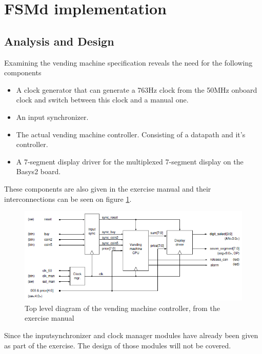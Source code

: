 \section{FSMd implementation}
\subsection{Analysis and Design}
Examining the vending machine specification reveals the need for the following components

\begin{itemize}
    \item A clock generator that can generate a 763Hz clock from the 50MHz onboard clock and switch between this clock and a manual one.
    \item An input synchronizer.
    \item The actual vending machine controller. Consisting of a datapath and it's controller.
    \item A 7-segment display driver for the multiplexed 7-segment display on the Basys2 board.
\end{itemize}

These components are also given in the exercise manual and their interconnections can be seen on figure \ref{vending_top}.

\begin{figure}[h]
    \center
    \includegraphics[width=1\textwidth]{pictures/vending_top.png}
    \caption{Top level diagram of the vending machine controller, from the exercise manual}
    \label{vending_top}
\end{figure}

Since the inputsynchronizer and clock manager modules have already been given as part of the exercise. The design of those modules will not be covered.

